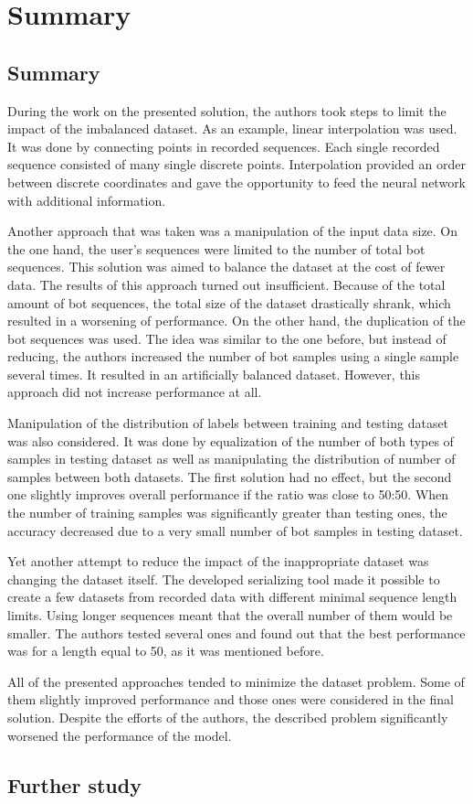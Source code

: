\chapter{Summary}\label{ch:summary}

\section{Summary}\label{sec:summary}
During the work on the presented solution, the authors took steps to limit the impact of the imbalanced dataset.
As an example, linear interpolation was used.
It was done by connecting points in recorded sequences.
Each single recorded sequence consisted of many single discrete points.
Interpolation provided an order between discrete coordinates and gave the opportunity to feed the neural network with additional information.

Another approach that was taken was a manipulation of the input data size.
On the one hand, the user's sequences were limited to the number of total bot sequences.
This solution was aimed to balance the dataset at the cost of fewer data.
The results of this approach turned out insufficient.
Because of the total amount of bot sequences, the total size of the dataset drastically shrank, which resulted in a worsening of performance.
On the other hand, the duplication of the bot sequences was used.
The idea was similar to the one before, but instead of reducing, the authors increased the number of bot samples using a single sample several times.
It resulted in an artificially balanced dataset.
However, this approach did not increase performance at all.

Manipulation of the distribution of labels between training and testing dataset was also considered.
It was done by equalization of the number of both types of samples in testing dataset as well as manipulating the distribution of number of samples between both datasets.
The first solution had no effect, but the second one slightly improves overall performance if the ratio was close to \num{50}:\num{50}.
When the number of training samples was significantly greater than testing ones, the accuracy decreased due to a very small number of bot samples in testing dataset.

Yet another attempt to reduce the impact of the inappropriate dataset was changing the dataset itself.
The developed serializing tool made it possible to create a few datasets from recorded data with different minimal sequence length limits.
Using longer sequences meant that the overall number of them would be smaller.
The authors tested several ones and found out that the best performance was for a length equal to \num{50}, as it was mentioned before.

All of the presented approaches tended to minimize the dataset problem.
Some of them slightly improved performance and those ones were considered in the final solution.
Despite the efforts of the authors, the described problem significantly worsened the performance of the model.

\section{Further study}\label{sec:further-study}